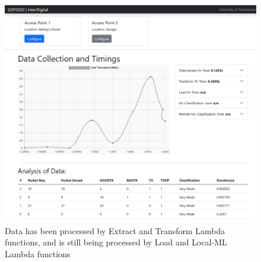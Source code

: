 \begin{figure}[ht]
    \centering
    \includegraphics[width=1\linewidth]{pages/Chapter5/Chapter 5 images/testing_pt1.png}
    \caption{Data has been processed by Extract and Transform Lambda functions, and is still being processed by Load and Local-ML Lambda functions}
    \label{fig:node_testing_1}
\end{figure}


